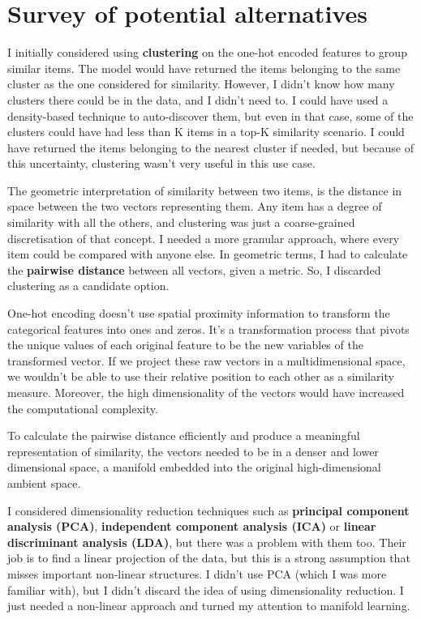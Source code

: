 
\section{Survey of potential alternatives}

I initially considered using \textbf{clustering} on the one-hot encoded features to group similar items.
The model would have returned the items belonging to the same cluster as the one considered for similarity.
However, I didn't know how many clusters there could be in the data, and I didn't need to.
I could have used a density-based technique to auto-discover them,
but even in that case, some of the clusters could have had less than K items in a top-K similarity scenario.
I could have returned the items belonging to the nearest cluster if needed, but because of this uncertainty,
clustering wasn't very useful in this use case.

The geometric interpretation of similarity between two items, is the distance in space between the two vectors representing them.
Any item has a degree of similarity with all the others, and clustering was just a coarse-grained discretisation of that concept.
I needed a more granular approach, where every item could be compared with anyone else.
In geometric terms, I had to calculate the \textbf{pairwise distance} between all vectors, given a metric.
So, I discarded clustering as a candidate option.

One-hot encoding doesn't use spatial proximity information to transform the categorical features into ones and zeros.
It's a transformation process that pivots the unique values of each original feature to be the new variables of the transformed vector.
If we project these raw vectors in a multidimensional space, we wouldn't be able to use their
relative position to each other as a similarity measure. Moreover, the high dimensionality of the vectors would have increased
the computational complexity.

To calculate the pairwise distance efficiently and produce a meaningful representation of similarity,
the vectors needed to be in a denser and lower dimensional space,
a manifold embedded into the original high-dimensional ambient space.

I considered dimensionality reduction techniques such as \textbf{principal component analysis (PCA)},
\textbf{independent component analysis (ICA)} or \textbf{linear discriminant analysis (LDA)},
but there was a problem with them too.
Their job is to find a linear projection of the data,
but this is a strong assumption that misses important non-linear structures.
I didn't use PCA (which I was more familiar with),
but I didn't discard the idea of using dimensionality reduction.
I just needed a non-linear approach and turned my attention to manifold learning.

